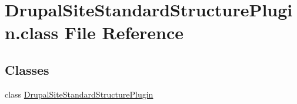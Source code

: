 \hypertarget{DrupalSiteStandardStructurePlugin_8class}{\section{Drupal\-Site\-Standard\-Structure\-Plugin.\-class File Reference}
\label{DrupalSiteStandardStructurePlugin_8class}
}
\subsection*{Classes}
\begin{DoxyCompactItemize}
\item 
class \hyperlink{classDrupalSiteStandardStructurePlugin}{Drupal\-Site\-Standard\-Structure\-Plugin}
\end{DoxyCompactItemize}
